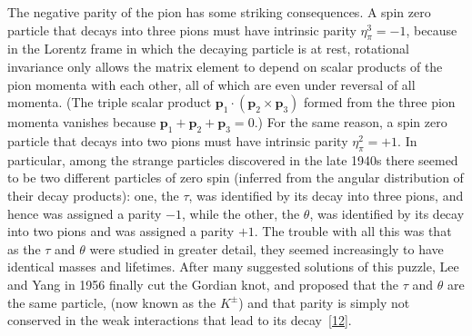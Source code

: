 The negative parity of the pion has some striking consequences. A spin zero particle
that decays into three pions must have intrinsic parity $\eta_\pi^3=-1$, because in
the Lorentz frame in which the decaying particle is at rest, rotational invariance
only allows the matrix element to depend on scalar products of the pion momenta with
each other, all of which are even under reversal of all momenta. (The triple scalar
product $\mathbf{p}_1\cdot(\mathbf{p}_2\times\mathbf{p}_3)$ formed from the three
pion momenta vanishes because $\mathbf{p}_1+\mathbf{p}_2+\mathbf{p}_3=0$.) For the
same reason, a spin zero particle that decays into two pions must have intrinsic
parity $\eta_\pi^2=+1$. In particular, among the strange particles discovered in
the late 1940s there seemed to be two different particles of zero spin (inferred
from the angular distribution of their decay products): one, the $\tau$, was
identified by its decay into three pions, and hence was assigned a parity $-1$,
while the other, the $\theta$, was identified by its decay into two pions and was
assigned a parity $+1$. The trouble with all this was that as the $\tau$ and
$\theta$ were studied in greater detail, they seemed increasingly to have identical
masses and lifetimes. After many suggested solutions of this puzzle, Lee and Yang
in 1956 finally cut the Gordian knot, and proposed that the $\tau$ and $\theta$ are
the same particle, (now known as the $K^\pm$) and that parity is simply not conserved
in the weak interactions that lead to its decay~\hyperref[ref:3.12]{[12]}.

